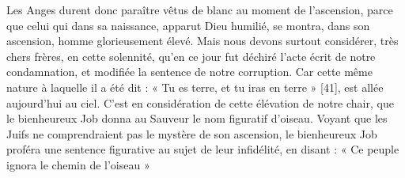 Les Anges durent donc paraître vêtus de blanc au moment de l’ascension, parce que celui qui dans sa naissance, apparut Dieu humilié, se montra, dans son ascension, homme glorieusement élevé. Mais nous devons surtout considérer, très chers frères, en cette solennité, qu’en ce jour fut déchiré l’acte écrit de notre condamnation, et modifiée la sentence de notre corruption. Car cette même nature à laquelle il a été dit : « Tu es terre, et tu iras en terre » [41], est allée aujourd’hui au ciel. C’est en considération de cette élévation de notre chair, que le bienheureux Job donna au Sauveur le nom figuratif d’oiseau. Voyant que les Juifs ne comprendraient pas le mystère de son ascension, le bienheureux Job proféra une sentence figurative au sujet de leur infidélité, en disant : « Ce peuple ignora le chemin de l’oiseau »